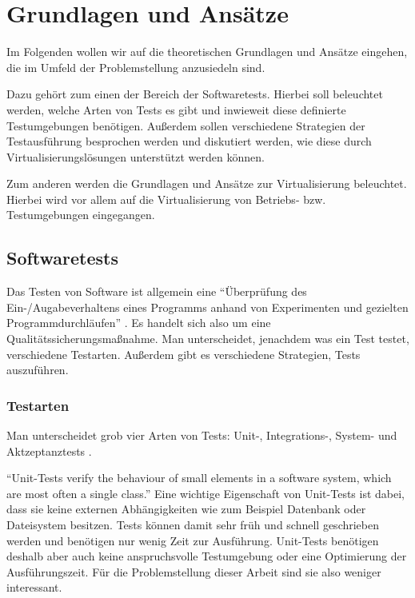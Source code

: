 \section{Grundlagen und Ansätze}

Im Folgenden wollen wir auf die theoretischen Grundlagen und Ansätze eingehen, die im Umfeld der Problemstellung anzusiedeln sind.

Dazu gehört zum einen der Bereich der Softwaretests. Hierbei soll beleuchtet werden, welche Arten von Tests es gibt und inwieweit diese definierte Testumgebungen benötigen. Außerdem sollen verschiedene Strategien der Testausführung besprochen werden und diskutiert werden, wie diese durch Virtualisierungslösungen unterstützt werden können.

Zum anderen werden die Grundlagen und Ansätze zur Virtualisierung beleuchtet. Hierbei wird vor allem auf die Virtualisierung von Betriebs- bzw. Testumgebungen eingegangen.

\subsection{Softwaretests}

Das Testen von Software ist allgemein eine "`Überprüfung des Ein-/Augabeverhaltens eines Programms anhand von Experimenten und gezielten Programmdurchläufen"' \citep[S.][S.662]{itduden}. Es handelt sich also um eine Qualitätssicherungsmaßnahme. Man unterscheidet, jenachdem was ein Test testet, verschiedene Testarten. Außerdem gibt es verschiedene Strategien, Tests auszuführen.

\subsubsection{Testarten}

Man unterscheidet grob vier Arten von Tests: Unit-, Integrations-, System- und Aktzeptanztests \citep[Vgl.][S. 129 ff]{DuvMatAnd07}.


"`Unit-Tests verify the behaviour of small elements in a software system, which are most often a single class."' \citep[S.][S. 132]{DuvMatAnd07} Eine wichtige Eigenschaft von Unit-Tests ist dabei, dass sie keine externen Abhängigkeiten wie zum Beispiel Datenbank oder Dateisystem besitzen. Tests können damit sehr früh und schnell geschrieben werden und benötigen nur wenig Zeit zur Ausführung. \citep[Vgl.][S. 133]{DuvMatAnd07} Unit-Tests benötigen deshalb aber auch keine anspruchsvolle Testumgebung oder eine Optimierung der Ausführungszeit. Für die Problemstellung dieser Arbeit sind sie also weniger interessant.


